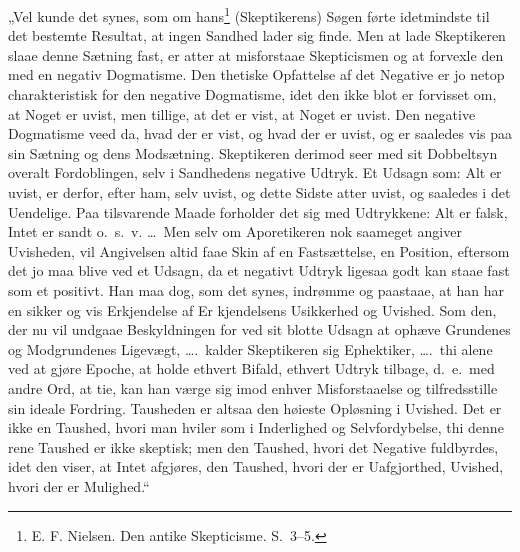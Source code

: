 \documentclass[12pt]{book}
\newcommand{\opage}[1]{\marginnote{\footnotesize\textit{[#1]}}}
\begin{document}
„Vel kunde det synes, som om hans\footnote{E. F. Nielsen. Den antike Skepticisme. S.~3--5.}%
{} (Skeptikerens) Søgen førte idetmindste til det bestemte Resultat, at ingen Sandhed lader sig finde. Men at lade Skeptikeren slaae denne Sætning fast, er atter at misforstaae Skepticismen og at forvexle den med en negativ Dogmatisme. Den thetiske Opfattelse af det Negative er jo netop charakteristisk for den negative Dogmatisme, idet den ikke blot er forvisset om, at Noget er uvist, men tillige, at det er vist, at Noget er uvist. Den negative Dogmatisme veed da, hvad der er vist, og hvad der er uvist, og er saaledes vis paa sin Sætning og dens Modsætning. Skeptikeren derimod seer med sit Dobbeltsyn overalt Fordoblingen, selv i Sandhedens negative Udtryk. Et Udsagn som: Alt er uvist, er derfor, efter ham, selv uvist, og dette Sidste atter uvist, og saaledes i det Uendelige. Paa tilsvarende Maade forholder det sig med Udtrykkene: Alt er falsk, Intet er sandt o.\ s.\ v. \dots\ Men selv om Aporetikeren nok saameget angiver Uvisheden, vil Angivelsen altid faae Skin af en Fastsættelse, en Position, eftersom det jo maa blive ved et Udsagn, da et negativt Udtryk ligesaa godt kan staae fast som et positivt. Han maa dog, som det synes, indrømme og paastaae, at han har en sikker og vis Erkjendelse af Er%
\opage{221}kjendelsens Usikkerhed og Uvished. Som den, der nu vil undgaae Beskyldningen for ved sit blotte Udsagn at ophæve Grundenes og Modgrundenes Ligevægt, \dots.\ kalder Skeptikeren sig Ephektiker, \dots.\ thi alene ved at gjøre Epoche, at holde ethvert Bifald, ethvert Udtryk tilbage, d.\ e.\ med andre Ord, at tie, kan han værge sig imod enhver Misforstaaelse og tilfredsstille sin ideale Fordring. Tausheden er altsaa den høieste Opløsning i Uvished. Det er ikke en Taushed, hvori man hviler som i Inderlighed og Selvfordybelse, thi denne rene Taushed er ikke skeptisk; men den Taushed, hvori det Negative fuldbyrdes, idet den viser, at Intet afgjøres, den Taushed, hvori der er Uafgjorthed, Uvished, hvori der er Mulighed.“
\end{document}
